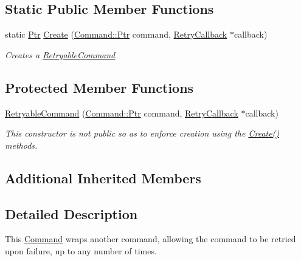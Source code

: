 \subsection*{Static Public Member Functions}
\begin{DoxyCompactItemize}
\item 
static \mbox{\hyperlink{class_command_lib_1_1_command_a3b3e4f00144373299df5c6bb1acc319d}{Ptr}} \mbox{\hyperlink{class_command_lib_1_1_retryable_command_ae37523bf0a28f0a3ad8953a59cc1a128}{Create}} (\mbox{\hyperlink{class_command_lib_1_1_command_a3b3e4f00144373299df5c6bb1acc319d}{Command\+::\+Ptr}} command, \mbox{\hyperlink{class_command_lib_1_1_retryable_command_1_1_retry_callback}{Retry\+Callback}} $\ast$callback)
\begin{DoxyCompactList}\small\item\em Creates a \mbox{\hyperlink{class_command_lib_1_1_retryable_command}{Retryable\+Command}} \end{DoxyCompactList}\end{DoxyCompactItemize}
\subsection*{Protected Member Functions}
\begin{DoxyCompactItemize}
\item 
\mbox{\hyperlink{class_command_lib_1_1_retryable_command_a0fc3a84697043a689c83106f9f9c6a4a}{Retryable\+Command}} (\mbox{\hyperlink{class_command_lib_1_1_command_a3b3e4f00144373299df5c6bb1acc319d}{Command\+::\+Ptr}} command, \mbox{\hyperlink{class_command_lib_1_1_retryable_command_1_1_retry_callback}{Retry\+Callback}} $\ast$callback)
\begin{DoxyCompactList}\small\item\em This constructor is not public so as to enforce creation using the \mbox{\hyperlink{class_command_lib_1_1_retryable_command_ae37523bf0a28f0a3ad8953a59cc1a128}{Create()}} methods. \end{DoxyCompactList}\end{DoxyCompactItemize}
\subsection*{Additional Inherited Members}


\subsection{Detailed Description}
This \mbox{\hyperlink{class_command_lib_1_1_command}{Command}} wraps another command, allowing the command to be retried upon failure, up to any number of times. 



